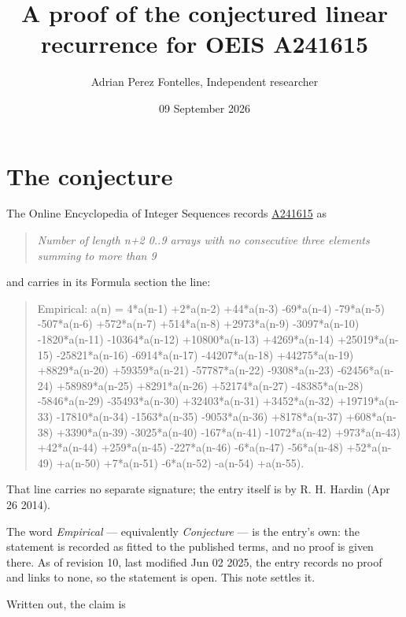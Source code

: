 \documentclass[11pt]{article}
\title{A proof of the conjectured linear recurrence for OEIS A241615}
\author{Adrian Perez Fontelles, Independent researcher}
\date{09 September 2026}
\theoremstyle{definition}
\begin{document}
\maketitle
\section{The conjecture}

The Online Encyclopedia of Integer Sequences records \href{https://oeis.org/A241615}{A241615} as

\begin{quote}\itshape Number of length n+2 0..9 arrays with no consecutive three elements summing to more than 9\end{quote}

and carries in its Formula section the line:

\begin{quote}\ttfamily Empirical: a(n) = 4*a(n-1) +2*a(n-2) +44*a(n-3) -69*a(n-4) -79*a(n-5) -507*a(n-6) +572*a(n-7) +514*a(n-8) +2973*a(n-9) -3097*a(n-10) -1820*a(n-11) -10364*a(n-12) +10800*a(n-13) +4269*a(n-14) +25019*a(n-15) -25821*a(n-16) -6914*a(n-17) -44207*a(n-18) +44275*a(n-19) +8829*a(n-20) +59359*a(n-21) -57787*a(n-22) -9308*a(n-23) -62456*a(n-24) +58989*a(n-25) +8291*a(n-26) +52174*a(n-27) -48385*a(n-28) -5846*a(n-29) -35493*a(n-30) +32403*a(n-31) +3452*a(n-32) +19719*a(n-33) -17810*a(n-34) -1563*a(n-35) -9053*a(n-36) +8178*a(n-37) +608*a(n-38) +3390*a(n-39) -3025*a(n-40) -167*a(n-41) -1072*a(n-42) +973*a(n-43) +42*a(n-44) +259*a(n-45) -227*a(n-46) -6*a(n-47) -56*a(n-48) +52*a(n-49) +a(n-50) +7*a(n-51) -6*a(n-52) -a(n-54) +a(n-55).\end{quote}

That line carries no separate signature; the entry itself is by R. H. Hardin (Apr 26 2014).

The word {\itshape Empirical} --- equivalently {\itshape Conjecture} --- is the entry's own: the statement is recorded as fitted to the published terms, and no proof is given there. As of revision 10, last modified Jun 02 2025, the entry records no proof and links to none, so the statement is open. This note settles it.

Written out, the claim is
\end{document}
